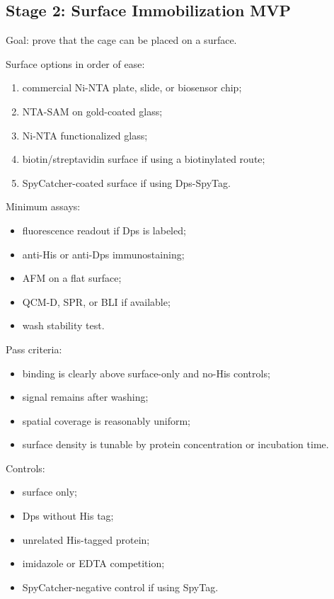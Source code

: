 \documentclass[11pt]{article}
\begin{document}
\subsection{Stage 2: Surface Immobilization MVP}

Goal: prove that the cage can be placed on a surface.

Surface options in order of ease:

\begin{enumerate}
\item commercial Ni-NTA plate, slide, or biosensor chip;
\item NTA-SAM on gold-coated glass;
\item Ni-NTA functionalized glass;
\item biotin/streptavidin surface if using a biotinylated route;
\item SpyCatcher-coated surface if using Dps-SpyTag.
\end{enumerate}

Minimum assays:

\begin{itemize}
\item fluorescence readout if Dps is labeled;
\item anti-His or anti-Dps immunostaining;
\item AFM on a flat surface;
\item QCM-D, SPR, or BLI if available;
\item wash stability test.
\end{itemize}

Pass criteria:

\begin{itemize}
\item binding is clearly above surface-only and no-His controls;
\item signal remains after washing;
\item spatial coverage is reasonably uniform;
\item surface density is tunable by protein concentration or incubation time.
\end{itemize}

Controls:

\begin{itemize}
\item surface only;
\item Dps without His tag;
\item unrelated His-tagged protein;
\item imidazole or EDTA competition;
\item SpyCatcher-negative control if using SpyTag.
\end{itemize}
\end{document}
